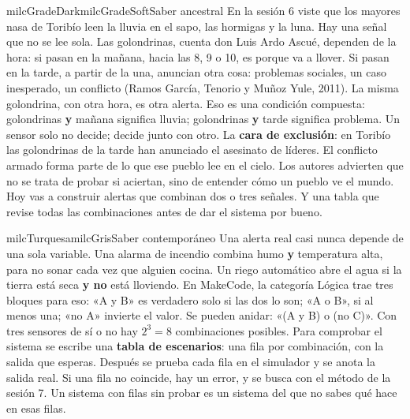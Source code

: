 \documentclass[11pt,letterpaper]{article}
\begin{document}
\begin{softbox}{milcGradeDark}{milcGradeSoft}{Saber ancestral}
En la sesión 6 viste que los mayores nasa de Toribío leen la lluvia en el sapo, las hormigas y la luna. Hay una señal que no se lee sola. Las golondrinas, cuenta don Luis Ardo Ascué, dependen de la hora: si pasan en la mañana, hacia las 8, 9 o 10, es porque va a llover. Si pasan en la tarde, a partir de la una, anuncian otra cosa: problemas sociales, un caso inesperado, un conflicto (Ramos García, Tenorio y Muñoz Yule, 2011). La misma golondrina, con otra hora, es otra alerta. Eso es una condición compuesta: golondrinas \textbf{y} mañana significa lluvia; golondrinas \textbf{y} tarde significa problema. Un sensor solo no decide; decide junto con otro. La \textbf{cara de exclusión}: en Toribío las golondrinas de la tarde han anunciado el asesinato de líderes. El conflicto armado forma parte de lo que ese pueblo lee en el cielo. Los autores advierten que no se trata de probar si aciertan, sino de entender cómo un pueblo ve el mundo. Hoy vas a construir alertas que combinan dos o tres señales. Y una tabla que revise todas las combinaciones antes de dar el sistema por bueno.\par{}
\end{softbox}

\begin{softbox}{milcTurquesa}{milcGris}{Saber contemporáneo}
Una alerta real casi nunca depende de una sola variable. Una alarma de incendio combina humo \textbf{y} temperatura alta, para no sonar cada vez que alguien cocina. Un riego automático abre el agua si la tierra está seca \textbf{y no} está lloviendo. En MakeCode, la categoría Lógica trae tres bloques para eso: «A y B» es verdadero solo si las dos lo son; «A o B», si al menos una; «no A» invierte el valor. Se pueden anidar: «(A y B) o (no C)». Con tres sensores de sí o no hay $2^3 = 8$ combinaciones posibles. Para comprobar el sistema se escribe una \textbf{tabla de escenarios}: una fila por combinación, con la salida que esperas. Después se prueba cada fila en el simulador y se anota la salida real. Si una fila no coincide, hay un error, y se busca con el método de la sesión 7. Un sistema con filas sin probar es un sistema del que no sabes qué hace en esas filas.
\end{softbox}
\end{document}
